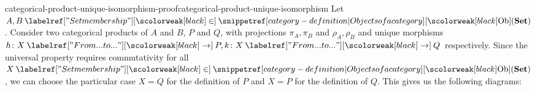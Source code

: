 \documentclass[preview]{standalone}
\begin{document}
\begin{snippetproof}{categorical-product-unique-isomorphism-proof}{categorical-product-unique-isomorphism}{}
    Let \(A,B \in \catob(\mathbf{Set})\).
    Consider two categorical products of \(A\) and \(B\),
    \(P\) and \(Q\), with projections \(\pi_A, \pi_B\) and \(\rho_A, \rho_B\)
    and unique morphisms \(h \colon X \fromto P, k \colon X \fromto Q\)
    respectively. Since the universal property requires commutativity
    for all \(X\in \catob(\mathbf{Set})\), we can choose the particular case
    \(X=Q\) for the definition of \(P\) and \(X=P\) for the definition of \(Q\).
    This gives us the following diagrams: \\
    \begin{minipage}{0.5\textwidth}
        \begin{center}
        \end{center}
    \end{minipage}
    \begin{minipage}{0.5\textwidth}
        \begin{center}
\end{center}
\end{minipage}
\end{snippetproof}
\end{document}
